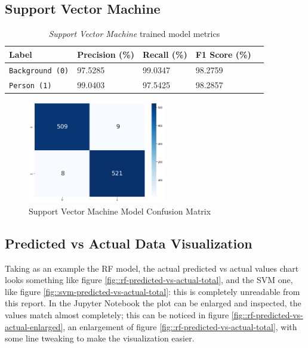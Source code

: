 \documentclass{article}
\begin{document}
\subsection[]{Support Vector Machine}

\begin{table}[h!]
	\centering
	\begin{tabular}{l|llll}
		\toprule 
		Label & Precision (\%) & Recall (\%) & F1 Score (\%) \\
		\midrule
		\rowcolor{black!10} \texttt{Background (0)} & 97.5285 & 99.0347 & 98.2759 \\
		\texttt{Person (1)} & 99.0403 & 97.5425 & 98.2857 \\
		\bottomrule
	\end{tabular}
	\caption{\textit{Support Vector Machine} trained model metrics}
	\label{tab:svm-results}
 \end{table}

\begin{figure}[h!]
	\centering
	\includegraphics[width=6cm]{assets/SVM-confusion-matrix.png}
	\caption{Support Vector Machine Model Confusion Matrix}
	\label{fig::svm-confusion-matrix}
\end{figure}

\subsection[]{Predicted vs Actual Data Visualization}

Taking as an example the RF model, the actual predicted vs actual values chart looks something like figure \ref{fig::rf-predicted-vs-actual-total}, and the SVM one, like figure \ref{fig::svm-predicted-vs-actual-total}: this is completely unreadable from this report. In the Jupyter Notebook the plot can be enlarged and inspected, the values match almost completely; this can be noticed in figure \ref{fig::rf-predicted-vs-actual-enlarged}, an enlargement of figure \ref{fig::rf-predicted-vs-actual-total}, with some line tweaking to make the visualization easier.
\end{document}
